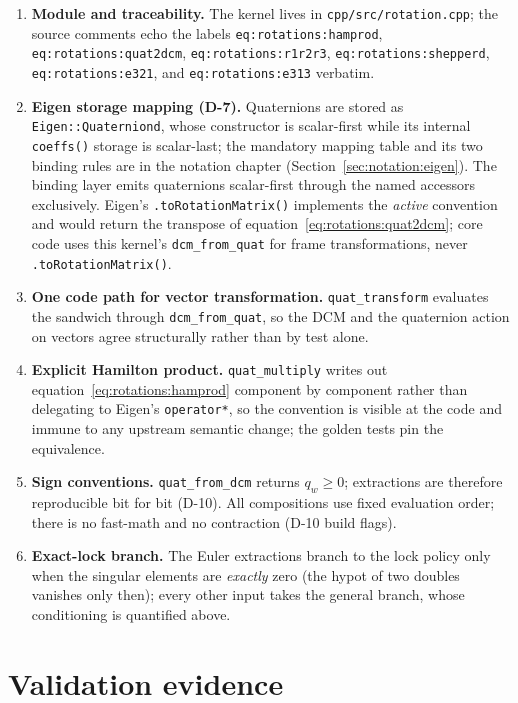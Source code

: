 \begin{enumerate}
  \item \textbf{Module and traceability.} The kernel lives in
    \texttt{cpp/src/rotation.cpp}; the source comments echo the labels
    \texttt{eq:rotations:hamprod}, \texttt{eq:rotations:quat2dcm},
    \texttt{eq:rotations:r1r2r3}, \texttt{eq:rotations:shepperd},
    \texttt{eq:rotations:e321}, and \texttt{eq:rotations:e313} verbatim.
  \item \textbf{Eigen storage mapping (D-7).} Quaternions are stored as
    \texttt{Eigen::Quaterniond}, whose constructor is scalar-first while
    its internal \texttt{coeffs()} storage is scalar-last; the mandatory
    mapping table and its two binding rules are in the notation chapter
    (Section~\ref{sec:notation:eigen}). The binding layer emits
    quaternions scalar-first through the named accessors exclusively.
    Eigen's \texttt{.toRotationMatrix()} implements the \emph{active}
    convention and would return the transpose of
    equation~\eqref{eq:rotations:quat2dcm}; core code uses this kernel's
    \texttt{dcm\_from\_quat} for frame transformations, never
    \texttt{.toRotationMatrix()}.
  \item \textbf{One code path for vector transformation.}
    \texttt{quat\_transform} evaluates the sandwich through
    \texttt{dcm\_from\_quat}, so the DCM and the quaternion action on
    vectors agree structurally rather than by test alone.
  \item \textbf{Explicit Hamilton product.} \texttt{quat\_multiply} writes
    out equation~\eqref{eq:rotations:hamprod} component by component
    rather than delegating to Eigen's \texttt{operator*}, so the
    convention is visible at the code and immune to any upstream semantic
    change; the golden tests pin the equivalence.
  \item \textbf{Sign conventions.} \texttt{quat\_from\_dcm} returns
    $q_w \geq 0$; extractions are therefore reproducible bit for bit
    (D-10). All compositions use fixed evaluation order; there is no
    fast-math and no contraction (D-10 build flags).
  \item \textbf{Exact-lock branch.} The Euler extractions branch to the
    lock policy only when the singular elements are \emph{exactly} zero
    (the hypot of two doubles vanishes only then); every other input takes
    the general branch, whose conditioning is quantified above.
\end{enumerate}

\section{Validation evidence}
\label{sec:rotations:validation}


